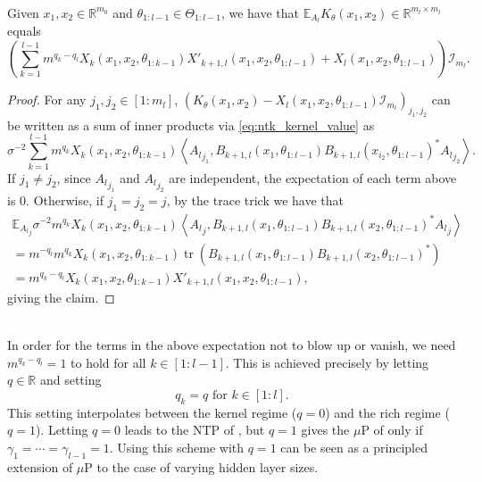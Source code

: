 \documentclass[twoside,11pt]{article}
\newcommand{\R}{\mathbb{R}}
\newcommand{\E}{\mathbb{E}}
\newcommand{\Id}{\mathcal{I}}
\DeclareMathOperator{\tr}{tr}
\begin{document}
\begin{proposition}\label{prop:readout_expectation}~\\
Given $x_1, x_2 \in \R^{m_0}$ and $\theta_{1:l-1} \in \Theta_{1:l-1}$, we have that $\E_{A_l} K_\theta(x_1,x_2) \in \R^{m_l \times m_l}$ equals
\[
\left( \sum_{k=1}^{l-1} m^{q_k-q_l} X_k(x_1,x_2,\theta_{1:k-1}) X'_{k+1,l}(x_1,x_2,\theta_{1 : l-1}) + X_l(x_1,x_2,\theta_{1:l-1}) \right) \Id_{m_l}.
\]
\end{proposition}
\begin{proof}
For any $j_1,j_2 \in [1:m_l]$, $(K_\theta(x_1,x_2) - X_l(x_1,x_2,\theta_{1:l-1}) \Id_{m_l})_{j_1,j_2}$ can be written as a sum of inner products via \eqref{eq:ntk_kernel_value} as
\[
\sigma^{-2} \sum_{k=1}^{l-1} m^{q_k} X_k(x_1,x_2,\theta_{1:k-1}) \left\langle {A_l}_{j_1}, B_{k+1,l}(x_1, \theta_{1 : l-1}) {B_{k+1,l}(x_{i_2}, \theta_{1 : l-1})}^* {A_l}_{j_2} \right\rangle.
\]
If $j_1 \neq j_2$, since ${A_l}_{j_1}$ and ${A_l}_{j_2}$ are independent, the expectation of each term above is $0$. Otherwise, if $j_1 = j_2 = j$, by the trace trick we have that
\begin{multline*}
\E_{{A_l}_j} \sigma^{-2} m^{q_k} X_k(x_1,x_2,\theta_{1:k-1}) \left\langle {A_l}_j, B_{k+1,l}(x_1, \theta_{1 : l-1}) {B_{k+1,l}(x_2, \theta_{1 : l-1})}^* {A_l}_j \right\rangle \\
= m^{-q_l} m^{q_k} X_k(x_1,x_2,\theta_{1:k-1}) \tr\left( B_{k+1,l}(x_1, \theta_{1 : l-1}) {B_{k+1,l}(x_2, \theta_{1 : l-1})}^* \right) \\
= m^{q_k-q_l} X_k(x_1,x_2,\theta_{1:k-1}) X'_{k+1,l}(x_1,x_2,\theta_{1 : l-1}),
\end{multline*}
giving the claim.
\end{proof}

\begin{remark}\label{rem:optimal_q}~\\
In order for the terms in the above expectation not to blow up or vanish, we need $m^{q_k-q_l} = 1$ to hold for all $k \in [1:l-1]$. This is achieved precisely by letting $q \in \R$ and setting
\begin{equation}\label{eq:optimal_qs}
q_k = q \text{ for } k \in [1:l].
\end{equation}
This setting interpolates between the kernel regime ($q=0$) and the rich regime ($q=1$). Letting $q=0$ leads to the NTP of \citet{Jacotetal2018}, but $q=1$ gives the $\mu$P of \citet{Yangetal2022} only if $\gamma_1=\cdots=\gamma_{l-1}=1$. Using this scheme with $q=1$ can be seen as a principled extension of $\mu$P to the case of varying hidden layer sizes.
\end{remark}
\end{document}
